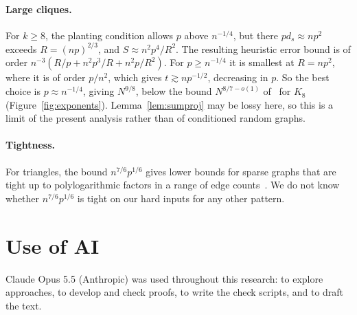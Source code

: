 \documentclass[11pt]{article}
\theoremstyle{remark}
\begin{document}
\paragraph{Large cliques.} For $k\ge8$, the planting condition allows $p$ above $n^{-1/4}$, but there $pd_s\approx np^2$ exceeds $R=(np)^{2/3}$, and $S\approx n^2p^4/R^2$. The resulting heuristic error bound is of order $n^{-3}(R/p+n^2p^3/R+n^2p/R^2)$. For $p\ge n^{-1/4}$ it is smallest at $R=np^2$, where it is of order $p/n^2$, which gives $t\gtrsim np^{-1/2}$, decreasing in $p$. So the best choice is $p\approx n^{-1/4}$, giving $N^{9/8}$, below the bound $N^{8/7-o(1)}$ of~\cite{GZ26} for $K_8$ (Figure~\ref{fig:exponents}). Lemma~\ref{lem:sumproj} may be lossy here, so this is a limit of the present analysis rather than of conditioned random graphs.

\paragraph{Tightness.} For triangles, the bound $n^{7/6}p^{1/6}$ gives lower bounds for sparse graphs that are tight up to polylogarithmic factors in a range of edge counts~\cite{CGZ26}. We do not know whether $n^{7/6}p^{1/6}$ is tight on our hard inputs for any other pattern.

\section*{Use of AI}

Claude Opus 5.5 (Anthropic) was used throughout this research: to explore approaches, to develop and check proofs, to write the check scripts, and to draft the text.
\end{document}
